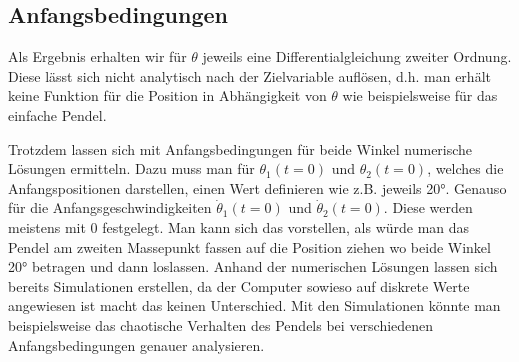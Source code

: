 \subsection{Anfangsbedingungen}
Als Ergebnis erhalten wir für \(\theta\) jeweils eine Differentialgleichung zweiter Ordnung.
Diese lässt sich nicht analytisch nach der Zielvariable auflösen,
d.h. man erhält keine Funktion für die Position in Abhängigkeit von \(\theta\) 
wie beispielsweise für das einfache Pendel. 

Trotzdem lassen sich mit Anfangsbedingungen für beide Winkel numerische Lösungen ermitteln.
Dazu muss man für \(\theta_1(t=0)\) und \(\theta_2(t=0)\), welches die Anfangspositionen darstellen,
einen Wert definieren wie z.B. jeweils 20°. Genauso für die Anfangsgeschwindigkeiten \(\dot{\theta}_1(t=0)\)
und \(\dot{\theta}_2(t=0)\).
Diese werden meistens mit 0 festgelegt. Man kann sich das vorstellen, als würde man das Pendel
am zweiten Massepunkt fassen auf die Position ziehen wo beide Winkel 20° betragen und dann loslassen.
Anhand der numerischen Lösungen lassen sich bereits Simulationen erstellen, da der Computer
sowieso auf diskrete Werte angewiesen ist macht das keinen Unterschied.
Mit den Simulationen könnte man beispielsweise das chaotische Verhalten des Pendels bei verschiedenen 
Anfangsbedingungen genauer analysieren.

